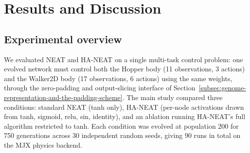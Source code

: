\documentclass[12pt]{article}
\begin{document}

\newpage

\section{Results and Discussion}
\label{sec:results-and-discussion}

\subsection{Experimental overview}
\label{subsec:experimental-overview}
We evaluated NEAT and HA-NEAT on a single multi-task control problem: one evolved network must control both the Hopper body (11 observations, 3 actions) and the Walker2D body (17 observations, 6 actions) using the same weights, through the zero-padding and output-slicing interface of Section~\ref{subsec:genome-representation-and-the-padding-scheme}.
The main study compared three conditions: standard NEAT (tanh only), HA-NEAT (per-node activations drawn from tanh, sigmoid, relu, sin, identity), and an ablation running HA-NEAT's full algorithm restricted to tanh.
Each condition was evolved at population 200 for 750 generations across 30 independent random seeds, giving 90 runs in total on the MJX physics backend.
\end{document}
